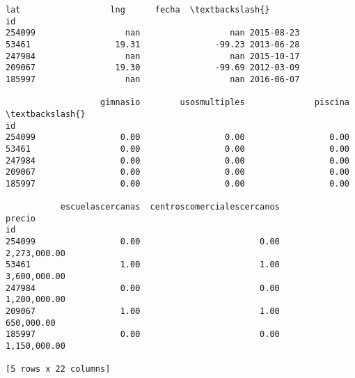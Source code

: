 \documentclass[11pt]{article}
\begin{document}
\begin{tcolorbox}[breakable, boxrule=.5pt, size=fbox, pad at break*=1mm, opacityfill=0]
\begin{Verbatim}[commandchars=\\\{\}]
                        lat                  lng      fecha  \textbackslash{}
id
254099                  nan                  nan 2015-08-23
53461                 19.31               -99.23 2013-06-28
247984                  nan                  nan 2015-10-17
209067                19.30               -99.69 2012-03-09
185997                  nan                  nan 2016-06-07

                   gimnasio        usosmultiples              piscina  \textbackslash{}
id
254099                 0.00                 0.00                 0.00
53461                  0.00                 0.00                 0.00
247984                 0.00                 0.00                 0.00
209067                 0.00                 0.00                 0.00
185997                 0.00                 0.00                 0.00

           escuelascercanas  centroscomercialescercanos               precio
id
254099                 0.00                        0.00         2,273,000.00
53461                  1.00                        1.00         3,600,000.00
247984                 0.00                        0.00         1,200,000.00
209067                 1.00                        1.00           650,000.00
185997                 0.00                        0.00         1,150,000.00

[5 rows x 22 columns]
\end{Verbatim}
\end{tcolorbox}
        
\end{document}
